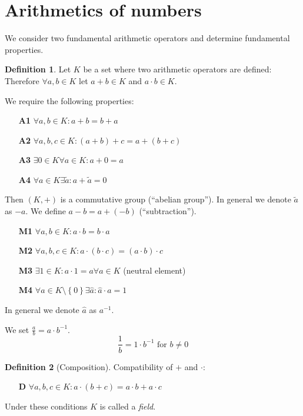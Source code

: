\documentclass[a4paper,landscape,twocolumn]{article}
\theoremstyle{definition}
\newtheorem{defi}{Definition}
\newcommand\set[1]{\left\{#1\right\}}
\begin{document}
\section{Arithmetics of numbers}
%
We consider two fundamental arithmetic operators and determine fundamental properties.

\begin{defi}
  Let $K$ be a set where two arithmetic operators are defined:
  Therefore $\forall a,b \in K$ let $a + b \in K$ and $a \cdot b \in K$.

  We require the following properties:
  \begin{itemize}
    \item[\textbf{A1}] $\forall a,b \in K: a + b = b + a$
    \item[\textbf{A2}] $\forall a,b,c \in K: (a + b) + c = a + (b + c)$
    \item[\textbf{A3}] $\exists 0 \in K \forall a \in K: a + 0 = a$
    \item[\textbf{A4}] $\forall a \in K \exists \tilde{a}: a + \tilde{a} = 0$
  \end{itemize}
  Then $(K, +)$ is a commutative group (\enquote{abelian group}).
  In general we denote $\tilde{a}$ as $-a$.
  We define $a - b = a + (-b)$ (\enquote{subtraction}).

  \begin{itemize}
    \item[\textbf{M1}] $\forall a,b \in K: a \cdot b = b \cdot a$
    \item[\textbf{M2}] $\forall a,b,c \in K: a \cdot (b \cdot c) = (a \cdot b) \cdot c$
    \item[\textbf{M3}] $\exists 1 \in K: a \cdot 1 = a \forall a \in K$ (neutral element)
    \item[\textbf{M4}] $\forall a \in K \setminus \set{0} \exists \hat a: \hat a \cdot a = 1$
  \end{itemize}
  In general we denote $\hat a$ as $a^{-1}$.

  We set $\frac ab = a \cdot b^{-1}$.
  \[ \frac{1}{b} = 1 \cdot b^{-1} \text{ for } b \neq 0 \]
\end{defi}

\begin{defi}[Composition]
  Compatibility of $+$ and $\cdot$:
  \begin{itemize}
    \item[\textbf{D}] $\forall a,b,c \in K: a \cdot (b + c) = a \cdot b + a \cdot c$
  \end{itemize}
  Under these conditions $K$ is called a \emph{field}.
\end{defi}
\end{document}
